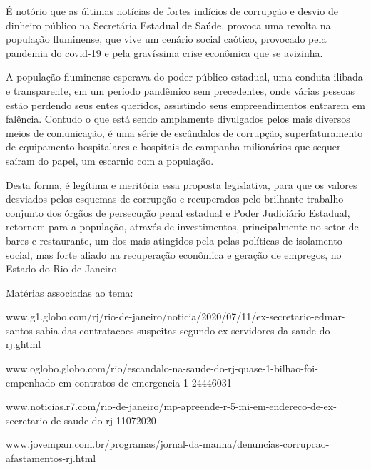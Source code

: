 \documentclass[10pt]{article}
\begin{document}
É notório que as últimas notícias de fortes indícios de corrupção e desvio de dinheiro público na Secretária Estadual de Saúde, provoca uma revolta na população fluminense, que vive um cenário social caótico, provocado pela pandemia do covid-19 e pela gravíssima crise econômica que se avizinha.

A população fluminense esperava do poder público estadual, uma conduta ilibada e transparente, em um período pandêmico sem precedentes, onde várias pessoas estão perdendo seus entes queridos, assistindo seus empreendimentos entrarem em falência. Contudo o que está sendo amplamente divulgados pelos mais diversos meios de comunicação, é uma série de escândalos de corrupção, superfaturamento de equipamento hospitalares e hospitais de campanha milionários que sequer saíram do papel, um escarnio com a população.

Desta forma, é legítima e meritória essa proposta legislativa, para que os valores desviados pelos esquemas de corrupção e recuperados pelo brilhante trabalho conjunto dos órgãos de persecução penal estadual e Poder Judiciário Estadual, retornem para a população, através de investimentos, principalmente no setor de bares e restaurante, um dos mais atingidos pela pelas políticas de isolamento social, mas forte aliado na recuperação econômica e geração de empregos, no Estado do Rio de Janeiro.  









Matérias associadas ao tema:

 www.g1.globo.com/rj/rio-de-janeiro/noticia/2020/07/11/ex-secretario-edmar-santos-sabia-das-contratacoes-suspeitas-segundo-ex-servidores-da-saude-do-rj.ghtml

www.oglobo.globo.com/rio/escandalo-na-saude-do-rj-quase-1-bilhao-foi-empenhado-em-contratos-de-emergencia-1-24446031

www.noticias.r7.com/rio-de-janeiro/mp-apreende-r-5-mi-em-endereco-de-ex-secretario-de-saude-do-rj-11072020


www.jovempan.com.br/programas/jornal-da-manha/denuncias-corrupcao-afastamentos-rj.html



\iffalse
\begin{center}
  \textbf{REFERÊNCIAS}
\end{center}


\fi
\end{document}
